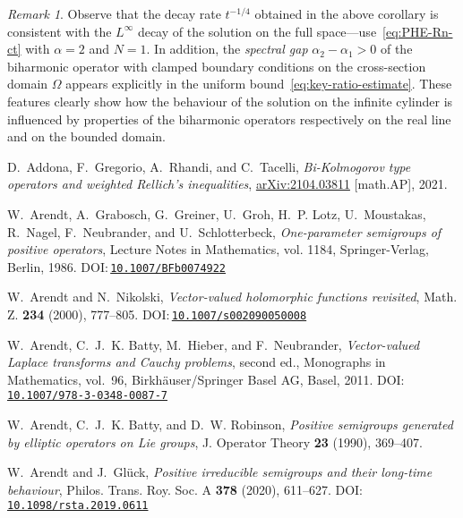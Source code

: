 \documentclass[a4paper, reqno]{amsart}
\numberwithin{equation}{section}
\theoremstyle{plain}
\theoremstyle{definition}
\theoremstyle{remark}
\newtheorem{remark}[theorem]{Remark}
\begin{document}
\begin{remark}
  Observe that the decay rate $t^{-1/4}$ obtained in the above corollary is consistent with the $L^\infty$ decay of the solution on the full space---use~\eqref{eq:PHE-Rn-ct} with $\alpha = 2$ and $N=1$. In addition, the \emph{spectral gap} $\alpha_2 - \alpha_1 > 0$ of the biharmonic operator with clamped boundary conditions on the cross-section domain $\Omega$ appears explicitly in the uniform bound~\eqref{eq:key-ratio-estimate}. These features clearly show how the behaviour of the solution on the infinite cylinder is influenced by properties of the biharmonic operators respectively on the real line and on the bounded domain.
\end{remark}

\begin{thebibliography}{10}

D.~Addona, F.~Gregorio, A.~Rhandi, and C.~Tacelli, \emph{Bi-{K}olmogorov type
  operators and weighted {R}ellich's inequalities},
  \href{https://arxiv.org/abs/2104.03811}{arXiv:2104.03811} [math.AP], 2021.

W.~Arendt, A.~Grabosch, G.~Greiner, U.~Groh, H.~P. Lotz, U.~Moustakas,
  R.~Nagel, F.~Neubrander, and U.~Schlotterbeck, \emph{One-parameter semigroups
  of positive operators}, Lecture Notes in Mathematics, vol. 1184,
  Springer-Verlag, Berlin, 1986.
  DOI:\,\href{https://doi.org/10.1007/BFb0074922}{\nolinkurl{10.1007/BFb0074922}}

W.~Arendt and N.~Nikolski, \emph{Vector-valued holomorphic functions
  revisited}, Math. Z. \textbf{234} (2000), 777--805.
  DOI:\,\href{https://doi.org/10.1007/s002090050008}{\nolinkurl{10.1007/s002090050008}}

W.~Arendt, C.~J.~K. Batty, M.~Hieber, and F.~Neubrander, \emph{Vector-valued
  {L}aplace transforms and {C}auchy problems}, second ed., Monographs in
  Mathematics, vol.~96, Birkh\"{a}user/Springer Basel AG, Basel, 2011.
  DOI:\,\href{https://doi.org/10.1007/978-3-0348-0087-7}{\nolinkurl{10.1007/978-3-0348-0087-7}}

W.~Arendt, C.~J.~K. Batty, and D.~W. Robinson, \emph{Positive semigroups
  generated by elliptic operators on {L}ie groups}, J. Operator Theory
  \textbf{23} (1990), 369--407.

W.~Arendt and J.~Gl\"{u}ck, \emph{Positive irreducible semigroups and their
  long-time behaviour}, Philos. Trans. Roy. Soc. A \textbf{378} (2020),
  611--627.
  DOI:\,\href{https://doi.org/10.1098/rsta.2019.0611}{\nolinkurl{10.1098/rsta.2019.0611}}


\end{thebibliography}
\end{document}

